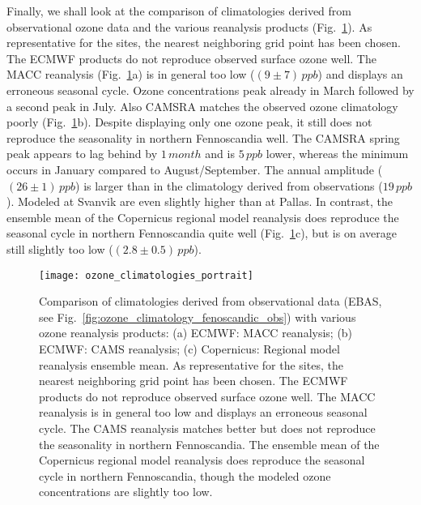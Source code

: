 \documentclass[bg, manuscript]{copernicus}
\begin{document}
Finally, we shall look at the comparison of climatologies derived from observational ozone data and the various reanalysis products (Fig.~\ref{fig:ozone_climatologies}). As representative for the sites, the nearest neighboring grid point has been chosen. The ECMWF products do not reproduce observed surface ozone well. The MACC reanalysis (Fig.~\ref{fig:ozone_climatologies}a) is in general too low ($(9\pm 7)\,\unit{ppb}$) and displays an erroneous seasonal cycle. Ozone concentrations peak already in March followed by a second peak in July. Also CAMSRA matches the observed ozone climatology poorly (Fig.~\ref{fig:ozone_climatologies}b). Despite displaying only one ozone peak, it still does not reproduce the seasonality in northern Fennoscandia well. The CAMSRA spring peak appears to lag behind by $1\,\unit{month}$ and is $5\,\unit{ppb}$ lower, whereas the minimum occurs in January compared to August/September. The annual amplitude ($(26\pm 1)\,\unit{ppb}$) is larger than in the climatology derived from observations ($19\,\unit{ppb}$). Modeled \chem{[O_3]} at Svanvik are even slightly higher than at Pallas. In contrast, the ensemble mean of the Copernicus regional model reanalysis does reproduce the seasonal cycle in northern Fennoscandia quite well (Fig.~\ref{fig:ozone_climatologies}c), but is on average still slightly too low ($(2.8\pm 0.5)\,\unit{ppb}$).

\begin{figure}[t]
  \texttt{[image: ozone\_climatologies\_portrait]}
  \caption{Comparison of climatologies derived from observational data (EBAS, see Fig.~\ref{fig:ozone_climatology_fenoscandic_obs}) with various ozone reanalysis products: (a) ECMWF: MACC reanalysis; (b) ECMWF: CAMS reanalysis; (c) Copernicus: Regional model reanalysis ensemble mean. As representative for the sites, the nearest neighboring grid point has been chosen. The ECMWF products do not reproduce observed surface ozone well. The MACC reanalysis is in general too low and displays an erroneous seasonal cycle. The CAMS reanalysis matches better but does not reproduce the seasonality in northern Fennoscandia. The ensemble mean of the Copernicus regional model reanalysis does reproduce the seasonal cycle in northern Fennoscandia, though the modeled ozone concentrations are slightly too low.}
  \label{fig:ozone_climatologies}
\end{figure}
\end{document}
